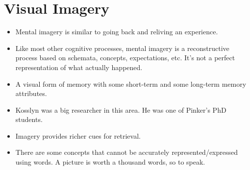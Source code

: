 \documentclass[]{article}
\newcommand{\lecture}[1]{\marginpar{{\footnotesize $\leftarrow$ \underline{#1}}}}
\begin{document}
	\section{Visual Imagery} \lecture{March 5, 2013}
		\begin{itemize}
			\item Mental imagery is similar to going back and reliving an experience.
			\item Like most other cognitive processes, mental imagery is a reconstructive process based on schemata, concepts, expectations, etc. It's not a perfect representation of what actually happened.
			\item A visual form of memory with some short-term and some long-term memory attributes.
			\item Kosslyn was a big researcher in this area. He was one of Pinker's PhD students.
			\item Imagery provides richer cues for retrieval.
			\item There are some concepts that cannot be accurately represented/expressed using words. A picture is worth a thousand words, so to speak.
		\end{itemize}
\end{document}
